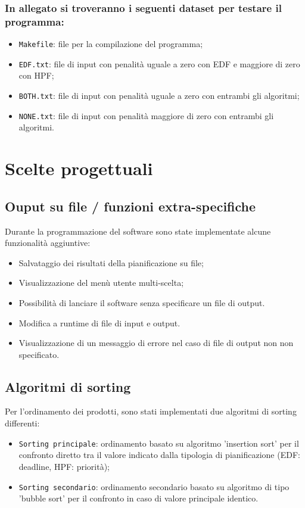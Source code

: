 \documentclass[a4paper]{report}
\begin{document}
\subsubsection{In allegato si troveranno i seguenti dataset per testare il programma:}
\begin{itemize}
  \item \texttt{Makefile}: file per la compilazione del programma;
  \item \texttt{EDF.txt}: file di input con penalità uguale a zero con EDF e maggiore di zero con HPF;
  \item \texttt{BOTH.txt}: file di input con penalità uguale a zero con entrambi gli algoritmi;
  \item \texttt{NONE.txt}: file di input con penalità maggiore di zero con entrambi gli algoritmi.
\end{itemize}

\section{Scelte progettuali}

  \subsection{Ouput su file / funzioni extra-specifiche}
  Durante la programmazione del software sono state implementate alcune funzionalità aggiuntive:
    \begin{itemize}
      \item Salvataggio dei risultati della pianificazione su file;
      \item Visualizzazione del menù utente multi-scelta;
      \item Possibilità di lanciare il software senza specificare un file di output.
      \item Modifica a runtime di file di input e output.
      \item Visualizzazione di un messaggio di errore nel caso di file di output non non specificato.
    \end{itemize}

  \subsection{Algoritmi di sorting}
  Per l'ordinamento dei prodotti, sono stati implementati due algoritmi di sorting differenti:

    \begin{itemize}
      \item \texttt{Sorting principale}: ordinamento basato su algoritmo 'insertion sort' per il confronto diretto tra il valore indicato dalla tipologia di pianificazione (EDF: deadline, HPF: priorità);
      \item \texttt{Sorting secondario}: ordinamento secondario basato su algoritmo di tipo 'bubble sort' per il confronto in caso di valore principale identico.
    \end{itemize}
    
\end{document}
